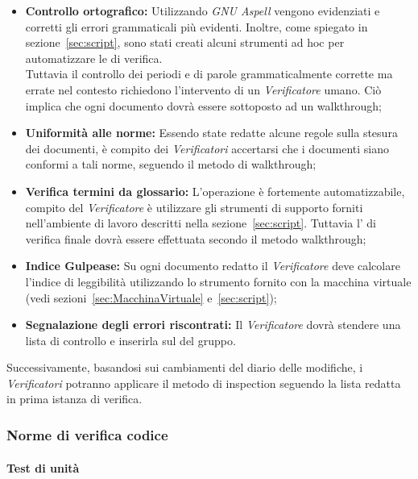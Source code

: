 \documentclass{scalatekids-article}
\begin{document}
\begin{itemize}
    \item\textbf{Controllo ortografico:} Utilizzando \textit{GNU Aspell} vengono evidenziati e corretti
        gli errori grammaticali più evidenti. Inoltre, come spiegato in sezione~\ref{sec:script}, sono stati
        creati alcuni strumenti ad hoc per automatizzare le  di verifica.\\
        Tuttavia il controllo dei periodi e di parole grammaticalmente corrette ma errate nel contesto richiedono
        l'intervento di un \textit{Verificatore} umano. Ciò implica che ogni documento dovrà essere sottoposto ad un walkthrough;
    \item\textbf{Uniformità alle norme:} Essendo state redatte alcune regole sulla stesura dei documenti, è compito dei \textit{Verificatori}
        accertarsi che i documenti siano conformi a tali norme, seguendo il metodo di walkthrough;
    \item\textbf{Verifica termini da glossario:} L'operazione è fortemente automatizzabile, compito del \textit{Verificatore} è utilizzare gli strumenti di supporto
        forniti nell'ambiente di lavoro descritti nella sezione~\ref{sec:script}. Tuttavia l' di verifica finale dovrà essere effettuata secondo il metodo
        walkthrough;
    \item\textbf{Indice Gulpease:} Su ogni documento redatto il \textit{Verificatore} deve calcolare l'indice di leggibilità utilizzando lo strumento fornito
        con la macchina virtuale (vedi sezioni~\ref{sec:MacchinaVirtuale} e~\ref{sec:script});
    \item\textbf{Segnalazione degli errori riscontrati:} Il \textit{Verificatore} dovrà stendere una lista di controllo e inserirla sul  del gruppo.
\end{itemize}
Successivamente, basandosi sui cambiamenti del diario delle modifiche, i
\textit{Verificatori} potranno applicare il metodo di inspection seguendo la
lista redatta in prima istanza di verifica.

\subsubsection{Norme di verifica codice}
\label{sec:NormeDiVerifica}

\paragraph{Test di unità}
\end{document}
